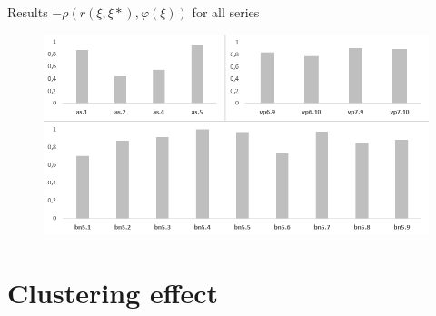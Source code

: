 \documentclass[aspectratio=169,xcolor=dvipsnames]{beamer}
\begin{document}
\begin{frame}{Results $-\rho(r(\xi, \xi*),\varphi(\xi))$ for all series}
    \begin{figure}
    \includegraphics[scale=0.8]{ro}
    \end{figure}
\end{frame}

\section{Clustering effect}
\end{document}
